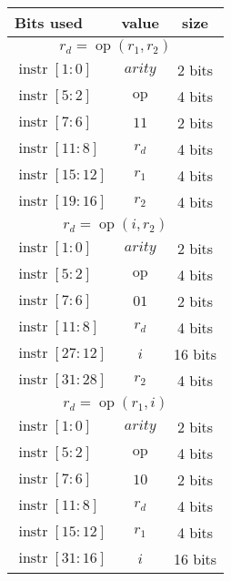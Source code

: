\documentclass{scrartcl}
\DeclareMathOperator{\op}{op}
\DeclareMathOperator{\instr}{instr}
\begin{document}
\begin{table}[h]
  \begin{minipage}{0.5\textwidth}
    \begin{tabular}{lcc}
      \toprule
      \textbf{Bits used} & \textbf{value} & \textbf{size}\\
      \midrule
      \multicolumn{3}{c}{\(r_d = \op(r_1, r_2)\)}\\
      \(\instr[1:0]\) & \(arity\) & 2 bits\\
      \(\instr[5:2]\) & \(\op\) & 4 bits\\
      \(\instr[7:6]\) & \(11\) & 2 bits\\
      \(\instr[11:8]\) & \(r_d\) & 4 bits\\
      \(\instr[15:12]\) & \(r_1\) & 4 bits\\
      \(\instr[19:16]\) & \(r_2\) & 4 bits\\
      \midrule
      \multicolumn{3}{c}{\(r_d = \op(i, r_2)\)}\\
      \(\instr[1:0]\) & \(arity\) & 2 bits\\
      \(\instr[5:2]\) & \(\op\) & 4 bits\\
      \(\instr[7:6]\) & \(01\) & 2 bits\\
      \(\instr[11:8]\) & \(r_d\) & 4 bits\\
      \(\instr[27:12]\) & \(i\) & 16 bits\\
      \(\instr[31:28]\) & \(r_2\) & 4 bits\\
      \midrule
      \multicolumn{3}{c}{\(r_d = \op(r_1, i)\)}\\
      \(\instr[1:0]\) & \(arity\) & 2 bits\\
      \(\instr[5:2]\) & \(\op\) & 4 bits\\
      \(\instr[7:6]\) & \(10\) & 2 bits\\
      \(\instr[11:8]\) & \(r_d\) & 4 bits\\
      \(\instr[15:12]\) & \(r_1\) & 4 bits\\
      \(\instr[31:16]\) & \(i\) & 16 bits\\
      \bottomrule
    \end{tabular}
  \end{minipage}
\end{table}
\end{document}
